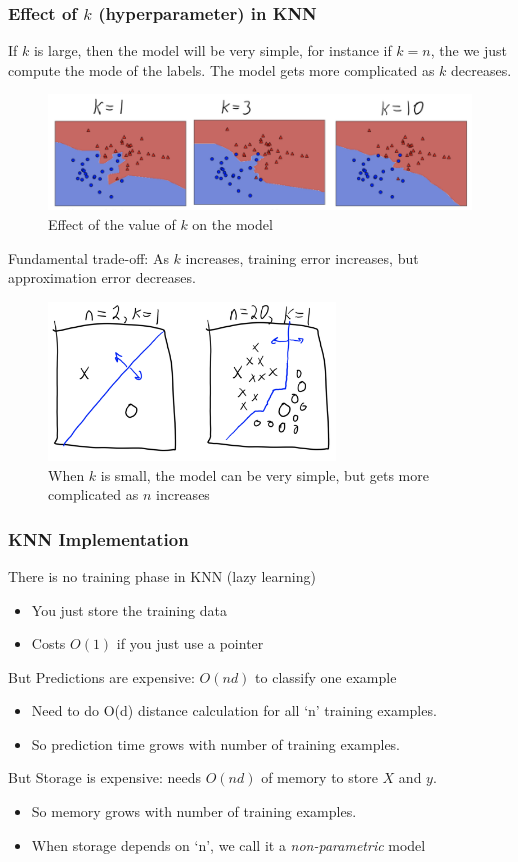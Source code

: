 \documentclass{article}
\theoremstyle{definition}
\begin{document}
\subsubsection*{Effect of $ k $ (hyperparameter) in KNN}
If $ k $ is large, then the model will be very simple, for instance if $ k=n $, the we just compute the mode of the labels. The model {\color{OliveGreen} gets more complicated as $ k $ decreases}.
\begin{figure}[H]
	\centering
	\includegraphics[width = 6in]{Pic3}
	\caption{Effect of the value of $ k $ on the model}
\end{figure}
\noindent Fundamental trade-off: {\color{OliveGreen} As $ k $ increases, training error increases, but approximation error decreases. }

\begin{figure}[H]
	\centering
	\includegraphics[width = 3in]{Pic5}
	\caption{When $ k $ is small, the model can be very simple, but gets more complicated as $ n $ increases}
\end{figure}

\subsubsection*{KNN Implementation}
There is {\color{OliveGreen} no training} phase in KNN (lazy learning)
\begin{itemize}
	\item You just store the training data
	\item Costs $ O(1) $ if you just use a pointer
\end{itemize}
But {\color{red} Predictions are expensive}: $ O(nd) $ to classify one example
\begin{itemize}
	\item Need to do O(d) distance calculation for all ‘n’ training examples.
	\item So {\color{OliveGreen} prediction time grows with number of training examples.}
\end{itemize}
But {\color{red} Storage is expensive}: needs $ O(nd) $ of memory to store $ X $ and $ y $. 
\begin{itemize}
	\item So {\color{OliveGreen} memory grows with number of training examples.}
	\item When storage depends on ‘n’, we call it a \textit{\color{blue} non-parametric} model
\end{itemize}
\end{document}
